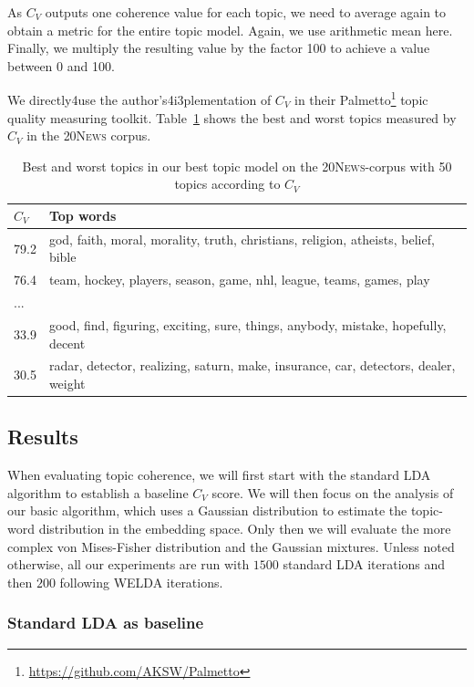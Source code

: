 \documentclass[
        a4paper,
        titlepage,
        twoside,
        parskip,
        numbers=noenddot
        ]{scrbook}
\newcommand{\ra}[1]{\renewcommand{\arraystretch}{#1}}
\theoremstyle{break}
\begin{document}
As $C_V$ outputs one coherence value for each topic, we need to average again to obtain a metric for the entire topic model.
Again, we use arithmetic mean here.
Finally, we multiply the resulting value by the factor 100 to achieve a value between 0 and 100.

\label{sec:tc_setup}
We directly4use the author's4i3plementation of $C_V$ in their Palmetto\footnote{\url{https://github.com/AKSW/Palmetto}} topic quality measuring toolkit.
Table~\ref{table:best_worst_cv_topics} shows the best and worst topics measured by $C_V$ in the \textsc{20News} corpus.
\begin{table}[]
  \ra{1.15}
  \centering
  \caption{Best and worst topics in our best topic model on the \textsc{20News}-corpus with 50 topics according to $C_V$}
  \begin{tabular}{ll}
  \toprule
  $C_V$ & Top words \\ \midrule
  79.2               & god, faith, moral, morality, truth, christians, religion, atheists, belief, bible \\
  76.4               & team, hockey, players, season, game, nhl, league, teams, games, play \\
  ...                &                    \\
  33.9               & good, find, figuring, exciting, sure, things, anybody, mistake, hopefully, decent \\
  30.5               & radar, detector, realizing, saturn, make, insurance, car, detectors, dealer, weight \\ \bottomrule
  \end{tabular}
  \label{table:best_worst_cv_topics}
\end{table}

\subsection{Results}

When evaluating topic coherence, we will first start with the standard LDA algorithm to establish a baseline $C_V$ score.
We will then focus on the analysis of our basic algorithm, which uses a Gaussian distribution to estimate the topic-word distribution in the embedding space.
Only then we will evaluate the more complex von Mises-Fisher distribution and the Gaussian mixtures.
Unless noted otherwise, all our experiments are run with $1500$ standard LDA iterations and then $200$ following WELDA iterations.

\subsubsection{Standard LDA as baseline}
\label{sec:lda_as_baseline}
\end{document}
